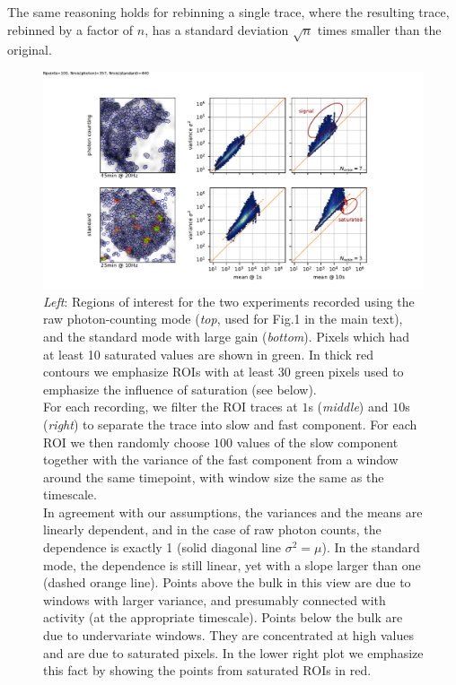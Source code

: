 \documentclass[a4paper,11pt,oneside,]{article}
\begin{document}
The same reasoning holds for rebinning a single trace, where the resulting trace, rebinned by a factor of $n$,  has a standard deviation $\sqrt{n}$ times smaller than the original.


\begin{figure}[t]
 \centering
 \includegraphics[trim=25mm 0 20mm 10mm, clip,scale=0.9]{figures/mean_vs_var.pdf}
 \caption{
 {\it Left}: Regions of interest for the two experiments recorded using the raw photon-counting mode ({\it top}, used for {\color{red} Fig.1} in the main text), and the standard mode with large gain ({\it bottom}). Pixels which had at least 10 saturated values are shown in green. In thick red contours we emphasize ROIs with at least 30 green pixels used to emphasize the influence of saturation (see below).
 \\
 For each recording, we filter the ROI traces at $1$s ({\it middle}) and $10$s ({\it right}) to separate the trace into slow and fast component. For each ROI we then randomly choose $100$ values of the slow component together with the variance of the fast component from a window around the same timepoint, with window size the same as the timescale.
 \\
 In agreement with our assumptions, the variances and the means are linearly dependent, and in the case of raw photon counts, the dependence is exactly 1 (solid diagonal line $\sigma^2=\mu$). In the standard mode, the dependence is still linear, yet with a slope larger than one (dashed orange line). Points above the bulk in this view are due to windows with larger variance, and presumably connected with activity (at the appropriate timescale). Points below the bulk are due to undervariate windows. They are concentrated at high values and are due to saturated pixels. In the lower right plot we emphasize this fact by showing the points from saturated ROIs in red.
 }
 \label{fig:mean_vs_var}
\end{figure}
\end{document}
